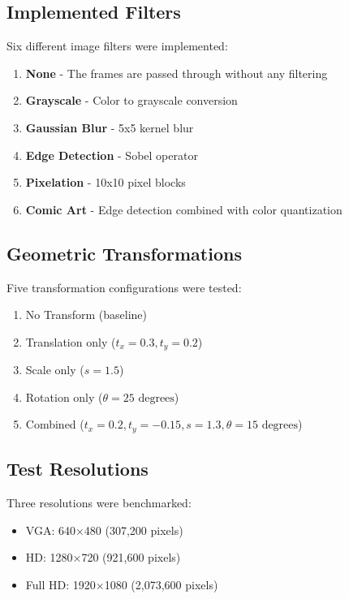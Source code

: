 \documentclass[12pt,a4paper]{article}
\begin{document}
\subsection{Implemented Filters}
Six different image filters were implemented:
\begin{enumerate}
    \item \textbf{None} - The frames are passed through without any filtering
    \item \textbf{Grayscale} - Color to grayscale conversion
    \item \textbf{Gaussian Blur} - 5x5 kernel blur
    \item \textbf{Edge Detection} - Sobel operator
    \item \textbf{Pixelation} - 10x10 pixel blocks
    \item \textbf{Comic Art} - Edge detection combined with color quantization
\end{enumerate}

\subsection{Geometric Transformations}
Five transformation configurations were tested:
\begin{enumerate}
    \item No Transform (baseline)
    \item Translation only ($t_x = 0.3, t_y = 0.2$)
    \item Scale only ($s = 1.5$)
    \item Rotation only ($\theta = 25 \text{ degrees}$)
    \item Combined ($t_x = 0.2, t_y = -0.15, s = 1.3, \theta = 15 \text{ degrees}$)
\end{enumerate}

\subsection{Test Resolutions}
Three resolutions were benchmarked:
\begin{itemize}
    \item VGA: 640×480 (307,200 pixels)
    \item HD: 1280×720 (921,600 pixels)
    \item Full HD: 1920×1080 (2,073,600 pixels)
\end{itemize}
\end{document}
